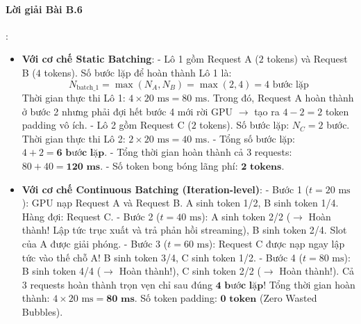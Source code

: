 \paragraph{Lời giải Bài B.6}:
\begin{itemize}
  \item[a)] \textbf{Với cơ chế Static Batching}:
  - Lô 1 gồm Request A ($2$ tokens) và Request B ($4$ tokens). Số bước lặp để hoàn thành Lô 1 là:
  \begin{equation*}
  N_{\text{batch\_1}} = \max(N_A, N_B) = \max(2, 4) = 4\text{ bước lặp}
  \end{equation*}
  Thời gian thực thi Lô 1: $4 \times 20\text{ ms} = 80\text{ ms}$.
  Trong đó, Request A hoàn thành ở bước 2 nhưng phải đợi hết bước 4 mới rời GPU $\to$ tạo ra $4 - 2 = 2$ token padding vô ích.
  - Lô 2 gồm Request C ($2$ tokens). Số bước lặp: $N_C = 2$ bước. Thời gian thực thi Lô 2: $2 \times 20\text{ ms} = 40\text{ ms}$.
  - Tổng số bước lặp: $4 + 2 = \mathbf{6\text{ bước lặp}}$.
  - Tổng thời gian hoàn thành cả 3 requests: $80 + 40 = \mathbf{120\text{ ms}}$.
  - Số token bong bóng lãng phí: $\mathbf{2\text{ tokens}}$.

  \item[b)] \textbf{Với cơ chế Continuous Batching (Iteration-level)}:
  - Bước 1 ($t = 20\text{ ms}$): GPU nạp Request A và Request B. A sinh token 1/2, B sinh token 1/4. Hàng đợi: Request C.
  - Bước 2 ($t = 40\text{ ms}$): A sinh token 2/2 ($\to$ Hoàn thành! Lập tức trục xuất và trả phản hồi streaming), B sinh token 2/4. Slot của A được giải phóng.
  - Bước 3 ($t = 60\text{ ms}$): Request C được nạp ngay lập tức vào thế chỗ A! B sinh token 3/4, C sinh token 1/2.
  - Bước 4 ($t = 80\text{ ms}$): B sinh token 4/4 ($\to$ Hoàn thành!), C sinh token 2/2 ($\to$ Hoàn thành!).
  Cả 3 requests hoàn thành trọn vẹn chỉ sau đúng $\mathbf{4\text{ bước lặp}}$!
  Tổng thời gian hoàn thành: $4 \times 20\text{ ms} = \mathbf{80\text{ ms}}$.
  Số token padding: $\mathbf{0\text{ token}}$ (Zero Wasted Bubbles).


\end{itemize}
